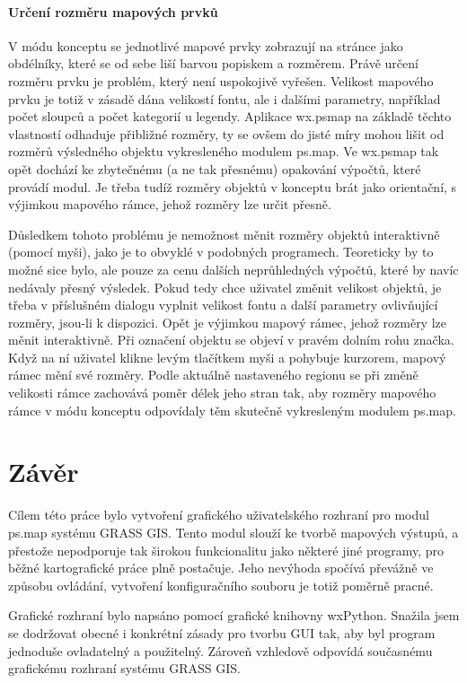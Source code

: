 \documentclass[a4paper,12pt,draft]{article}
\newcommand{\necislovana}[1]{%
\phantomsection
\addcontentsline{toc}{section}{#1}
\section*{#1}
\markboth{\uppercase{#1}}{}
}
\begin{document}
{ \paragraph*{Určení rozměru mapových prvků}
 V módu konceptu se jednotlivé mapové prvky zobrazují na
 stránce jako obdélníky, které se od sebe liší barvou popiskem
 a rozměrem. Právě určení rozměru prvku je problém, který není
 uspokojivě vyřešen. Velikost mapového prvku je totiž v zásadě dána
 velikostí fontu, ale i dalšími parametry, například počet sloupců
 a počet kategorií u legendy. Aplikace wx.psmap na základě těchto
 vlastností odhaduje přibližné rozměry, ty se ovšem do jisté míry
 mohou lišit od rozměrů výsledného objektu vykresleného modulem
 ps.map. Ve wx.psmap tak opět dochází ke zbytečnému (a ne
 tak přesnému) opakování výpočtů, které provádí modul. Je třeba
 tudíž rozměry objektů v konceptu brát jako orientační, s výjimkou
 mapového rámce, jehož rozměry lze určit přesně.

 Důsledkem tohoto problému je nemožnost měnit rozměry objektů
 interaktivně (pomocí myši), jako je to obvyklé v podobných
 programech. Teoreticky by to možné sice bylo, ale pouze za cenu
 dalších neprůhledných výpočtů, které by navíc nedávaly přesný
 výsledek. Pokud tedy chce uživatel změnit velikost objektů, je třeba
 v příslušném dialogu vyplnit velikost fontu a další parametry
 ovlivňující rozměry, jsou-li k dispozici. Opět je výjimkou mapový
 rámec, jehož rozměry lze měnit interaktivně. Při označení objektu
 se objeví v pravém dolním rohu značka. Když na ní uživatel klikne levým
tlačítkem myši a pohybuje kurzorem, mapový rámec mění své rozměry. Podle
aktuálně nastaveného regionu se při změně velikosti rámce zachovává poměr délek
jeho stran tak, aby rozměry mapového rámce v módu konceptu odpovídaly těm
skutečně vykresleným modulem ps.map.

\newpage
\necislovana{Závěr}

Cílem této práce  bylo vytvoření grafického uživatelského rozhraní  pro modul
ps.map systému GRASS GIS. Tento modul slouží ke tvorbě mapových
výstupů, a přestože nepodporuje tak širokou funkcionalitu jako některé jiné
programy, pro běžné kartografické práce plně postačuje. Jeho nevýhoda spočívá
převážně ve způsobu ovládání, vytvoření konfiguračního souboru je totiž poměrně
pracné.

Grafické rozhraní bylo napsáno pomocí grafické knihovny wxPython. Snažila jsem
se dodržovat obecné i konkrétní zásady pro tvorbu GUI tak, aby byl program
jednoduše ovladatelný a použitelný. Zároveň vzhledově odpovídá
současnému  grafickému rozhraní systému GRASS GIS.

}
\end{document}
